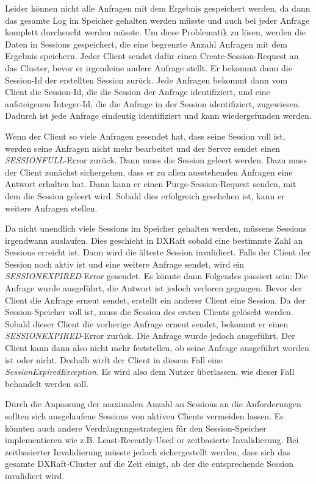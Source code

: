 Leider können nicht alle Anfragen mit dem Ergebnis gespeichert werden, da dann das gesamte Log im Speicher gehalten werden müsste und auch bei jeder Anfrage komplett durchsucht werden müsste. Um diese Problematik zu lösen, werden die Daten in Sessions gespeichert, die eine begrenzte Anzahl Anfragen mit dem Ergebnis speichern. Jeder Client sendet dafür einen Create-Session-Request an das Cluster, bevor er irgendeine andere Anfrage stellt. Er bekommt dann die Session-Id der erstellten Session zurück. Jede Anfragen bekommt dann vom Client die Session-Id, die die Session der Anfrage identifiziert, und eine aufsteigenen Integer-Id, die die Anfrage in der Session identifiziert, zugewiesen. Dadurch ist jede Anfrage eindeutig identifiziert und kann wiedergefunden werden.

Wenn der Client so viele Anfragen gesendet hat, dass seine Session voll ist, werden seine Anfragen nicht mehr bearbeitet und der Server sendet einen \textit{SESSION\textunderscore FULL}-Error zurück. Dann muss die Session geleert werden. Dazu muss der Client zunächst sichergehen, dass er zu allen ausstehenden Anfragen eine Antwort erhalten hat. Dann kann er einen Purge-Session-Request senden, mit dem die Session geleert wird. Sobald dies erfolgreich geschehen ist, kann er weitere Anfragen stellen.

Da nicht unendlich viele Sessions im Speicher gehalten werden, müssens Sessions irgendwann auslaufen. Dies geschieht in DXRaft sobald eine bestimmte Zahl an Sessions erreicht ist. Dann wird die älteste Session invalidiert. Falls der Client der Session noch aktiv ist und eine weitere Anfrage sendet, wird ein \textit{SESSION\textunderscore EXPIRED}-Error gesendet. Es könnte dann Folgendes passiert sein: Die Anfrage wurde ausgeführt, die Antwort ist jedoch verloren gegangen. Bevor der Client die Anfrage erneut sendet, erstellt ein anderer Client eine Session. Da der Session-Speicher voll ist, muss die Session des ersten Clients gelöscht werden. Sobald dieser Client die vorherige Anfrage erneut sendet, bekommt er einen \textit{SESSION\textunderscore EXPIRED}-Error zurück. Die Anfrage wurde jedoch ausgeführt. Der Client kann dann also nicht mehr feststellen, ob seine Anfrage ausgeführt worden ist oder nicht. Deshalb wirft der Client in diesem Fall eine \textit{SessionExpiredException}. Es wird also dem Nutzer überlassen, wie dieser Fall behandelt werden soll. 

Durch die Anpassung der maximalen Anzahl an Sessions an die Anforderungen sollten sich ausgelaufene Sessions von aktiven Clients vermeiden lassen. Es könnten auch andere Verdrängungsstrategien für den Session-Speicher implementieren wie z.B. Least-Recently-Used or zeitbasierte Invalidierung. Bei zeitbasierter Invalidierung müsste jedoch sichergestellt werden, dass sich das gesamte DXRaft-Cluster auf die Zeit einigt, ab der die entsprechende Session invalidiert wird.

